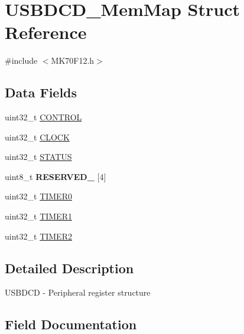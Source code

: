 \hypertarget{struct_u_s_b_d_c_d___mem_map}{}\section{U\+S\+B\+D\+C\+D\+\_\+\+Mem\+Map Struct Reference}
\label{struct_u_s_b_d_c_d___mem_map}


{\ttfamily \#include $<$M\+K70\+F12.\+h$>$}

\subsection*{Data Fields}
\begin{DoxyCompactItemize}
\item 
uint32\+\_\+t \hyperlink{struct_u_s_b_d_c_d___mem_map_a6d1149f9d598e71d5f6d5cf12ab1a5d5}{C\+O\+N\+T\+R\+O\+L}
\item 
uint32\+\_\+t \hyperlink{struct_u_s_b_d_c_d___mem_map_a86ba3b0e7a077a4b9afbe207f335216c}{C\+L\+O\+C\+K}
\item 
uint32\+\_\+t \hyperlink{struct_u_s_b_d_c_d___mem_map_aef7d6303adc8b41b479d65f8f1d4c3e2}{S\+T\+A\+T\+U\+S}
\item 
\hypertarget{struct_u_s_b_d_c_d___mem_map_aeeaa1cbcb5736bfa5b4a3c025d6b2840}{}uint8\+\_\+t {\bfseries R\+E\+S\+E\+R\+V\+E\+D\+\_} \mbox{[}4\mbox{]}\label{struct_u_s_b_d_c_d___mem_map_aeeaa1cbcb5736bfa5b4a3c025d6b2840}

\item 
uint32\+\_\+t \hyperlink{struct_u_s_b_d_c_d___mem_map_aecfb36e34db08abcd8984d10a9f87e7c}{T\+I\+M\+E\+R0}
\item 
uint32\+\_\+t \hyperlink{struct_u_s_b_d_c_d___mem_map_aa8bcdbeba3cbd7a27281d317ba5484e9}{T\+I\+M\+E\+R1}
\item 
uint32\+\_\+t \hyperlink{struct_u_s_b_d_c_d___mem_map_abaa84a33ed5173cf08f87f3590a3f035}{T\+I\+M\+E\+R2}
\end{DoxyCompactItemize}


\subsection{Detailed Description}
U\+S\+B\+D\+C\+D -\/ Peripheral register structure 

\subsection{Field Documentation}
\hypertarget{struct_u_s_b_d_c_d___mem_map_a86ba3b0e7a077a4b9afbe207f335216c}{}

